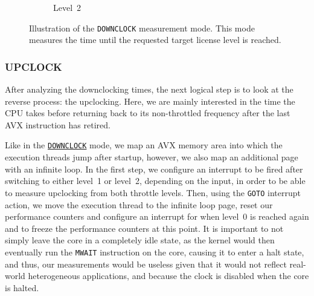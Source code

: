 \begin{figure*}
\begin{subfigure}[b]{0.5\textwidth}
		\caption{Level~2}
	\end{subfigure}
	\caption{Illustration of the \texttt{DOWNCLOCK} measurement mode. This mode measures the time until the requested target license level is reached.}
	\label{fig:analysis:design:measurementmodes:downclock}
\end{figure*}

\subsubsection{UPCLOCK}
\label{sec:analysis:design:measurementmodes:upclock}

After analyzing the downclocking times, the next logical step is to look at the reverse process: the upclocking. Here, we are mainly interested in the time the \gls{CPU} takes before returning back to its non-throttled frequency after the last \gls{AVX} instruction has retired.

Like in the \hyperref[sec:analysis:design:measurementmodes:downclock]{\texttt{DOWNCLOCK}} mode, we map an \gls{AVX} memory area into which the execution threads jump after startup, however, we also map an additional page with an infinite loop. In the first step, we configure an interrupt to be fired after switching to either level~1 or level~2, depending on the input, in order to be able to measure upclocking from both throttle levels. Then, using the \texttt{GOTO} interrupt action, we move the execution thread to the infinite loop page, reset our performance counters and configure an interrupt for when level~0 is reached again and to freeze the performance counters at this point. It is important to not simply leave the core in a completely idle state, as the kernel would then eventually run the \texttt{MWAIT} \cite{intelsdminstructionreference} instruction on the core, causing it to enter a halt state, and thus, our measurements would be useless given that it would not reflect real-world heterogeneous applications, and because the clock is disabled when the core is halted.

